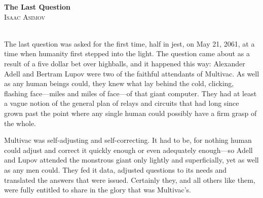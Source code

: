 \documentclass[11pt,twocolumn,paper=a5,pagesize,twoside]{scrartcl}
\newcommand{\initial}[1]{ \lettrine[lines=3,lhang=0.3,nindent=0em]{  {\textsf{#1}}}{}}
\begin{document}




\thispagestyle{empty}
\vspace*{2cm}



\newpage
\setcounter{page}{1}

{\parindent0mm  \textbf{The Last Question}\\
	\textsc{Isaac Asimov}\\
}
\ \\



\pagebreak


\initial{T}he last question was asked for the first time, half in jest, on May 21, 
2061, at a time when humanity first stepped into the light. The question
came about as a result of a five dollar bet over highballs, and it happened
this way:
Alexander Adell and Bertram Lupov were two of the faithful attendants of 
Multivac. As well as any human beings could, they knew what lay behind the 
cold, clicking, flashing face---miles and miles of face---of that giant
computer. They had at least a vague notion of the general plan of relays 
and circuits that had long since grown past the point where any single 
human could possibly have a firm grasp of the whole.

Multivac was self-adjusting and self-correcting. It had to be, for nothing 
human could adjust and correct it quickly enough or even adequately 
enough---so Adell and Lupov attended the monstrous giant only lightly and 
superficially, yet as well as any men could. They fed it data, adjusted 
questions to its needs and translated the answers that were issued. 
Certainly they, and all others like them, were fully entitled to share 
in the glory that was Multivac's.
\end{document}
